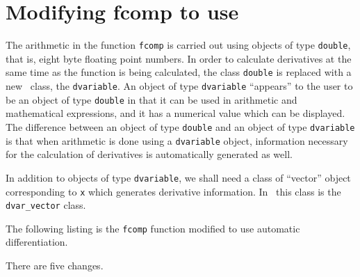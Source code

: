 \documentclass[12pt]{book}
\begin{document}
\section{Modifying fcomp to use \AD}
The arithmetic 
 in the function {\tt fcomp} is carried out using
objects of type {\tt double}, that is, eight byte floating point
numbers. In order to calculate derivatives at the same time
as the function is being calculated, the class {\tt double}
is replaced with a new \AD\ class, the {\tt dvariable}. 
An object of type {\tt dvariable} ``appears'' to the user to
be an object of type {\tt double} in that it can be used in
arithmetic and mathematical expressions, and it has a numerical
value which can be displayed. The difference between an object of
type {\tt double} and an object of type {\tt dvariable} is that 
when arithmetic is done using a {\tt dvariable} object, information
necessary for the calculation of derivatives is automatically
generated as well. 

In addition to objects of type {\tt dvariable}, we shall need
a class of ``vector'' object corresponding to {\tt x} which generates 
derivative information. In \AD\ this class is the {\tt dvar\_vector}
class. 


The following listing is the {\tt fcomp} function
modified to use automatic differentiation. 
\bigbreak
{}

\noindent There are five changes.
\end{document}
